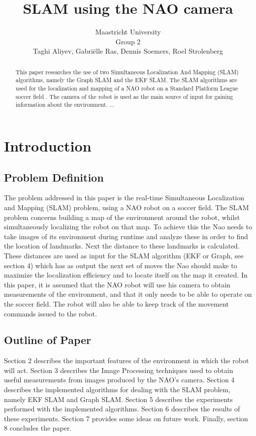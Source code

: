 \documentclass{ba-kecs}
\title{SLAM using the NAO camera}
\author{Maastricht University \\ Group 2 \\ Taghi Aliyev, Gabri\"elle Ras, Dennis Soemers, Roel Strolenberg}
\numberwithin{figure}{section}
\numberwithin{equation}{section}
\begin{document}
\maketitle


\begin{abstract}

This paper researches the use of two Simultaneous Localization And Mapping (SLAM) algorithms, namely the Graph SLAM and the EKF SLAM. The SLAM algorithms are used for the localization and mapping of a NAO robot on a Standard Platform League soccer field \cite{cd1}. The camera of the robot is used as the main source of input for gaining information about the environment.
...

\end{abstract}


\section{Introduction}


\subsection{Problem Definition}
The problem addressed in this paper is the real-time Simultaneous Localization and Mapping (SLAM) problem, using a NAO robot on a soccer field. The SLAM problem concerns building a map of the environment around the robot, whilst simultaneously localizing the robot on that map. To achieve this the Nao needs to take images of its environment during runtime and analyze these in order to find the location of landmarks. Next the distance to these landmarks is calculated. These distances are used as input for the SLAM algorithm (EKF or Graph, see section 4) which has as output the next set of moves the Nao should make to maximize the localization efficiency and to locate itself on the map it created.
	In this paper, it is assumed that the NAO robot will use his camera to obtain measurements of the environment, and that it only needs to be able to operate on the soccer field. The robot will also be able to keep track of the movement commands issued to the robot.

\subsection{Outline of Paper}
Section 2 describes the important features of the environment in which the robot will act. Section 3 describes the Image Processing techniques used to obtain useful measurements from images produced by the NAO's camera. Section 4 describes the implemented algorithms for dealing with the SLAM problem, namely EKF SLAM and Graph SLAM.  Section 5 describes the experiments performed with the implemented algorithms. Section 6 describes the results of these experiments. Section 7 provides some ideas on future work. Finally, section 8 concludes the paper.
\end{document}

